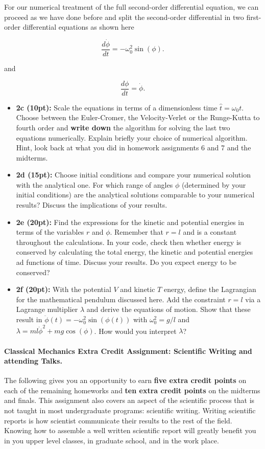 \documentclass[%
oneside,                 %
final,                   %
10pt]{article}
\begin{document}
\noindent
For our numerical treatment of the full second-order differential  equation, we can proceed as we have done before and split the second-order differential in two first-order differential equations
as shown here

\[
\frac{d\dot{\phi}}{dt}=-\omega_0^2\sin{(\phi)}.
\]

and

\[
\frac{d\phi}{dt}=\dot{\phi}.
\]

\begin{itemize}
\item \textbf{2c (10pt):} Scale the equations in terms of a dimensionless time $\hat{t}=\omega_0t$. Choose between the Euler-Cromer, the Velocity-Verlet or the Runge-Kutta to fourth order and \textbf{write down} the algorithm for solving the last two equations numerically. Explain briefly your choice of numerical algorithm. Hint, look back at what you did in homework assignments 6 and 7 and the  midterms.

\item \textbf{2d (15pt):} Choose initial conditions and compare your numerical solution with the analytical one. For which range of angles $\phi$ (determined by your initial conditions) are the analytical solutions comparable to your numerical results? Discuss the implications of your results.

\item \textbf{2e (20pt):} Find the expressions for the kinetic and potential energies in terms of the variables $r$ and $\phi$. Remember that $r=l$ and is a constant throughout the calculations. In your code, check then whether energy is conserved by calculating the total energy, the kinetic and potential energies ad functions of time. Discuss your results. Do you expect energy to be conserved? 

\item \textbf{2f (20pt):} With the potential $V$  and kinetic $T$ energy, define the Lagrangian for the mathematical pendulum discussed here. Add the constraint $r=l$ via a Lagrange multiplier $\lambda$ and derive the equations of motion. Show that these result in  $\ddot{\phi}(t)=-\omega_0^2\sin{(\phi(t))}$ with $\omega_0^2=g/l$ and $\lambda=ml\dot{\phi}^2+mg\cos{(\phi)}$.  How would you interpret $\lambda$? 
\end{itemize}

\noindent
\paragraph{Classical Mechanics Extra Credit Assignment: Scientific Writing and attending Talks.}
The following gives you an opportunity to earn \textbf{five extra credit
points} on each of the remaining homeworks and \textbf{ten extra credit points}
on the midterms and finals.  This assignment also covers an aspect of
the scientific process that is not taught in most undergraduate
programs: scientific writing.  Writing scientific reports is how
scientist communicate their results to the rest of the field.  Knowing
how to assemble a well written scientific report will greatly benefit
you in you upper level classes, in graduate school, and in the work
place.
\end{document}
